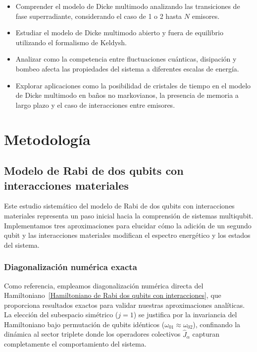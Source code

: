 \documentclass[onecolumn,notitlepage,letterpaper,aps,pra,12pt]{article}
\numberwithin{equation}{section}
\begin{document}
\begin{itemize}
    \item Comprender el modelo de Dicke multimodo analizando las transiciones de fase superradiante, considerando el caso de 1 o 2 hasta $N$ emisores.
    \item Estudiar el modelo de Dicke multimodo abierto y fuera de equilibrio utilizando el formalismo de Keldysh. 
    \item Analizar como la competencia entre fluctuaciones cuánticas, disipación y bombeo afecta las propiedades del sistema a diferentes escalas de energía. 
    \item Explorar aplicaciones como la posibilidad de cristales de tiempo en el modelo de Dicke multimodo en baños no markovianos, la presencia de memoria a largo plazo y el caso de interacciones entre emisores. 
\end{itemize}



\section{Metodología}

\subsection{Modelo de Rabi de dos qubits con interacciones materiales}

Este estudio sistemático del modelo de Rabi de dos qubits con interacciones materiales representa un paso inicial hacia la comprensión de sistemas multiqubit. Implementamos tres aproximaciones  para elucidar cómo la adición de un segundo qubit y las interacciones materiales modifican el espectro energético y los estados del sistema.

\subsubsection{Diagonalización numérica exacta}

Como referencia, empleamos diagonalización numérica directa del Hamiltoniano~\eqref{Hamiltoniano de Rabi dos qubits con interacciones}, que proporciona resultados exactos para validar nuestras aproximaciones analíticas. La elección del subespacio simétrico ($j=1$) se justifica por la invariancia del Hamiltoniano bajo permutación de qubits idénticos ($\omega_{01} \approx \omega_{02}$), confinando la dinámica al sector triplete donde los operadores colectivos $\hat{J}_{\alpha}$ capturan completamente el comportamiento del sistema.
\end{document}
